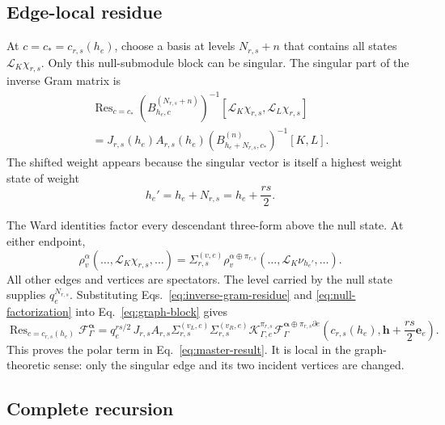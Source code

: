\documentclass[11pt]{article}
\newcommand{\F}{\mathcal F}
\newcommand{\ve}{\bm e}
\DeclareMathOperator{\Res}{Res}
\begin{document}
\subsection{Edge-local residue}
\label{sec:residue-derivation}

At \(c=c_*=c_{r,s}(h_e)\), choose a basis at levels
\(N_{r,s}+n\) that contains all states
\(\mathcal L_K\chi_{r,s}\).  Only this null-submodule block can be singular.
The singular part of the inverse Gram matrix is
\begin{multline}
 \Res_{c=c_*}
 \left(B_{h_e,c}^{(N_{r,s}+n)}\right)^{-1}
 [\mathcal L_K\chi_{r,s},\mathcal L_L\chi_{r,s}]
 \\
 =J_{r,s}(h_e)A_{r,s}(h_e)
  \left(B_{h_e+N_{r,s},c_*}^{(n)}\right)^{-1}[K,L].
 \label{eq:inverse-gram-residue}
\end{multline}
The shifted weight appears because the singular vector is itself a highest
weight state of weight
\begin{equation}
 h_e'=h_e+N_{r,s}=h_e+\frac{rs}{2}.
 \label{eq:shifted-weight}
\end{equation}

The Ward identities factor every descendant three-form above the null
state.  At either endpoint,
\begin{equation}
 \rho_v^\alpha(\ldots,\mathcal L_K\chi_{r,s},\ldots)
 =\Sigma_{r,s}^{(v,e)}
  \rho_v^{\alpha\oplus\pi_{r,s}}
  (\ldots,\mathcal L_K\nu_{h_e'},\ldots).
 \label{eq:null-factorization}
\end{equation}
All other edges and vertices are spectators.  The level carried by the null
state supplies \(q_e^{N_{r,s}}\).  Substituting
Eqs.~\eqref{eq:inverse-gram-residue} and
\eqref{eq:null-factorization} into Eq.~\eqref{eq:graph-block} gives
\begin{equation}
\boxed{
 \Res_{c=c_{r,s}(h_e)}\F_\Gamma^{\bm\alpha}
 =q_e^{rs/2}\,
  J_{r,s}A_{r,s}
  \Sigma_{r,s}^{(v_L,e)}
  \Sigma_{r,s}^{(v_R,e)}
  \mathcal K_{\Gamma,e}^{\pi_{r,s}}
  \F_\Gamma^{\bm\alpha\oplus\pi_{r,s}\partial e}
  \left(c_{r,s}(h_e),
        \bm h+\frac{rs}{2}\ve_e\right).}
 \label{eq:edge-residue}
\end{equation}
This proves the polar term in Eq.~\eqref{eq:master-result}.  It is local in
the graph-theoretic sense: only the singular edge and its two incident
vertices are changed.

\subsection{Complete recursion}
\label{sec:complete-recursion}
\end{document}

